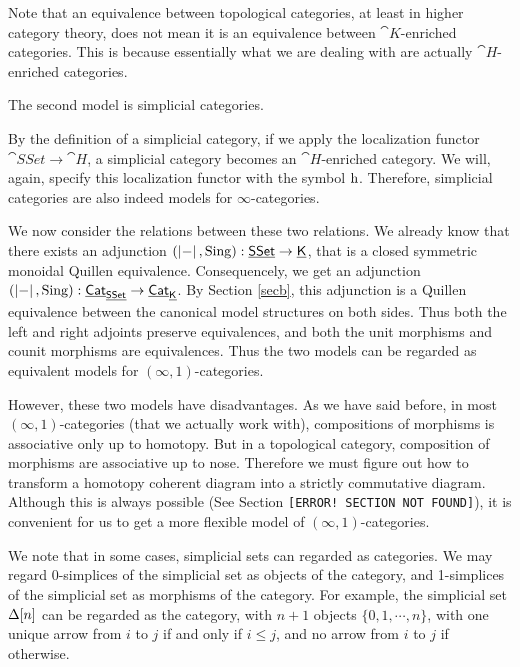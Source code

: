 Note that an equivalence between topological categories, at least in higher category theory, does not mean it is an equivalence
between $\cat K$-enriched categories. This is because essentially what we are dealing with are actually $\cat{H}$-enriched categories.

The second model is simplicial categories.


By the definition of a simplicial category, if we apply the localization functor $\cat{SSet}\to\cat H$, a simplicial category becomes an
$\cat{H}$-enriched category. We will, again, specify this localization functor with the symbol $\mathrm{h}$. Therefore, simplicial categories
are also indeed models for $\infty$-categories. 


We now consider the relations between these two relations. We already know that there exists an adjunction $(\left|-\right|,\operatorname{Sing}):\underline{\smash{\mathsf{SSet}}}\to\underline{\smash{\mathsf{K}}}$,
that is a closed symmetric monoidal Quillen equivalence. Consequencely, we get an adjunction 
$(\left|-\right|,\operatorname{Sing}):\underline{\smash{\mathsf{Cat}}}_{\underline{\smash{\mathsf{SSet}}}}\to\underline{\smash{\mathsf{Cat}}}_{\underline{\smash{\mathsf{K}}}}$. By Section \ref{secb}, this adjunction is a Quillen equivalence between the
canonical model structures on both sides. Thus both the left and right adjoints preserve equivalences, and both the unit morphisms 
and counit morphisms are equivalences. Thus the two models can be regarded as equivalent models for $(\infty,1)$-categories.

However, these two models have disadvantages. As we have said before, in most $(\infty,1)$-categories (that we actually work with), compositions
of morphisms is associative only up to homotopy. But in a topological category, composition of morphisms are associative up to nose. 
Therefore we must figure out how to transform a homotopy coherent diagram into a strictly commutative diagram. Although this is always
possible (See Section {\color{red}\texttt{[ERROR! SECTION NOT FOUND]}}), it is convenient for us to get a more flexible model 
of $(\infty,1)$-categories.

We note that in some cases, simplicial sets can regarded as categories. We may regard 0-simplices of the simplicial set as objects of the category,
and 1-simplices of the simplicial set as morphisms of the category. For example, the simplicial set $\Delta[n]$ can be regarded as the category, with
$n+1$ objects $\{0,1,\cdots,n\}$, with one unique arrow from $i$ to $j$ if and only if $i\le j$, and no arrow from $i$ to $j$ if otherwise. 